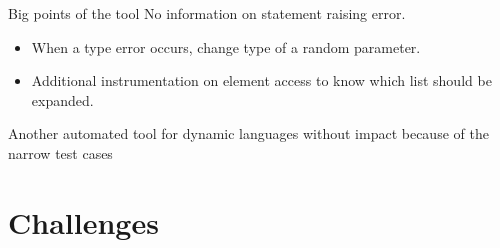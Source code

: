 \documentclass{beamer}
\begin{document}

\begin{frame}{Big points of the tool}
  No information on statement raising error.
  \begin{itemize}
    \item When a type error occurs, change type of a random parameter.

    \item Additional instrumentation on element access to know which list should be expanded.
  \end{itemize}

  \vfill

  Another automated tool for dynamic languages without impact because of the narrow test cases
\end{frame}




\section{Challenges}
\end{document}

